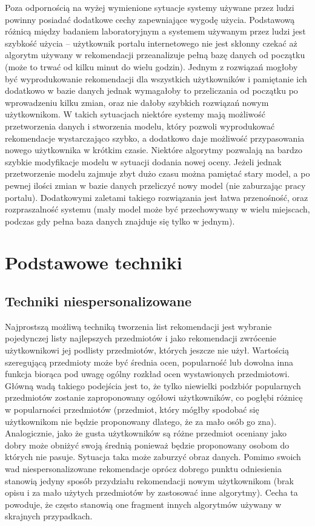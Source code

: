 \documentclass{pracamgr}
\begin{document}
   Poza odpornością na wyżej wymienione sytuacje systemy używane przez ludzi powinny posiadać dodatkowe cechy zapewniające wygodę użycia.
   Podstawową różnicą między badaniem laboratoryjnym a systemem używanym przez ludzi jest szybkość użycia --
   użytkownik portalu internetowego nie jest skłonny czekać aż algorytm używany w rekomendacji przeanalizuje pełną bazę danych od początku
   (może to trwać od kilku minut do wielu godzin).
   Jednym z rozwiązań mogłoby być wyprodukowanie rekomendacji dla wszystkich użytkowników i pamiętanie ich dodatkowo w bazie danych
   jednak wymagałoby to przeliczania od początku po wprowadzeniu kilku zmian, oraz nie dałoby szybkich rozwiązań nowym użytkownikom.
   W takich sytuacjach niektóre systemy mają możliwość przetworzenia danych i stworzenia modelu,
   który pozwoli wyprodukować rekomendacje wystarczająco szybko, a dodatkowo daje możliwość przypasowania nowego użytkownika w krótkim czasie.
   Niektóre algorytmy pozwalają na bardzo szybkie modyfikacje modelu w sytuacji dodania nowej oceny.
   Jeżeli jednak przetworzenie modelu zajmuje zbyt dużo czasu można pamiętać stary model,
   a po pewnej ilości zmian w bazie danych przeliczyć nowy model (nie zaburzając pracy portalu).
   Dodatkowymi zaletami takiego rozwiązania jest łatwa przenośność, oraz rozpraszalność systemu (mały model może być przechowywany w wielu miejscach,
   podczas gdy pełna baza danych znajduje się tylko w jednym).

 \chapter{Podstawowe techniki}
  \section{Techniki niespersonalizowane}
   Najprostszą możliwą techniką tworzenia list rekomendacji jest wybranie pojedynczej listy najlepszych przedmiotów
   i jako rekomendacji zwrócenie użytkownikowi jej podlisty przedmiotów, których jeszcze nie użył.
   Wartością szeregującą przedmioty może być średnia ocen, popularność lub dowolna inna funkcja biorąca pod uwagę ogólny rozkład ocen wystawionych przedmiotowi.
   Główną wadą takiego podejścia jest to, że tylko niewielki podzbiór popularnych przedmiotów zostanie zaproponowany ogółowi użytkowników,
   co pogłębi różnicę w popularności przedmiotów (przedmiot, który mógłby spodobać się użytkownikom nie będzie proponowany dlatego, że za mało osób go zna).
   Analogicznie, jako że gusta użytkowników są różne przedmiot oceniany jako dobry może obniżyć swoją średnią ponieważ będzie proponowany osobom do których nie pasuje.
   Sytuacja taka może zaburzyć obraz danych.\newline
   Pomimo swoich wad niespersonalizowane rekomendacje oprócz dobrego punktu odniesienia stanowią jedyny sposób przydziału rekomendacji nowym użytkownikom
   (brak opisu i za mało użytych przedmiotów by zastosować inne algorytmy).
   Cecha ta powoduje, że często stanowią one fragment innych algorytmów używany w skrajnych przypadkach. 
\end{document}
